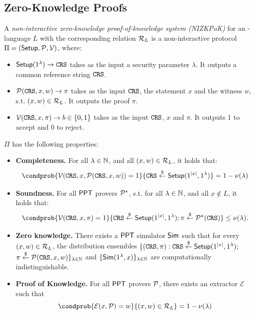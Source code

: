 \begin{definition}
    \end{definition}

\subsection{Zero-Knowledge Proofs}
\label{app:zk}

\begin{definition} \label{def: NIZK systems}
    A {\em non-interactive zero-knowledge proof-of-knowledge system (NIZKPoK)} for an \NP-language $L$ with the corresponding relation $\mathcal{R}_{L}$ 
    is a non-interactive protocol $\Pi = (\mathsf{Setup}, \mathcal{P}, \mathcal{V})$, where:
    \begin{itemize}%
        \item $\mathsf{Setup}( 1^{\lambda}) \rightarrow \mathtt{CRS}$ takes as the input a security parameter $\lambda$. It outputs a common reference string $\mathtt{CRS}$.
        \item $\mathcal{P}(\mathtt{CRS}, x, w) \rightarrow \pi$ takes as the input $\mathtt{CRS}$, the statement $x$ and the witness $w$, s.t. $(x, w) \in \mathcal{R}_{L}$. It outputs the proof $\pi$.
        \item $\mathcal{V}(\mathtt{CRS}, x, \pi) \rightarrow b \in \{0,1\}$ takes as the input $\mathtt{CRS}$, $x$ and $\pi$. It outputs 1 to accept and 0 to reject.
    \end{itemize}
    
    $\Pi$ has the following properties:
    \begin{itemize}%
    \item {\bf Completeness.} For all $\lambda \in \mathbb{N}$, and all $(x,w) \in \mathcal{R}_{L}$, it holds that:
    $$\condprob{\verifier(\crs, x, \prover(\crs, x, w)) = 1}{\crs \sample \setup(1^{|x|}, 1^\lambda)} = 1 - \negligible(\lambda)$$
    
    \item {\bf Soundness.} For all $\mathsf{PPT}$ provers $\mathcal{P}^{\star}$, s.t. for all $\lambda \in \mathbb{N}$, and all $x\notin L$, it holds that:
    $$\condprob{\verifier(\crs,x,\pi) = 1}{\crs \sample \setup(1^{|x|}, 1^{\lambda}); \pi \sample \prover^{\star}(\crs)} \leq \negligible(\lambda).$$
    
    \item {\bf Zero knowledge.} There exists a $\mathsf{PPT}$ simulator $\mathsf{Sim}$ such that 
    for every $(x,w)\in \mathcal{R}_{L}$, the distribution ensembles
    $\{(\mathtt{CRS},\pi): \mathtt{CRS} \overset{\$}{\gets} \mathsf{Setup}(1^{|x|}, 1^{\lambda});$ $\pi \overset{\$}{\gets} \mathcal{P}(\mathtt{CRS}, x, w)\}_{\lambda \in \mathbb{N}}$
    and $\{\mathsf{Sim}(1^{\lambda},x)\}_{\lambda\in\mathbb{N}}$
    are computationally indistinguishable.
    
    \item {\bf Proof of Knowledge.} For all $\mathsf{PPT}$ provers $\mathcal{P}$, there exists an extractor $\mathcal{E}$ such that
    $$\condprob{\mathcal{E}(x,\prover) = w}{(x,w) \in \relation{L}} = 1 - \negligible(\lambda)$$
    \end{itemize}

    \end{definition}


